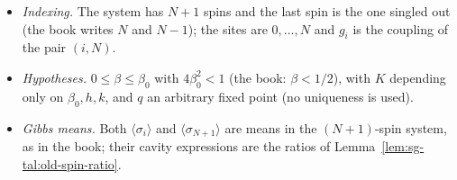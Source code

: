 \begin{remark}
\label{rem:sg-tal:dev-177}
\begin{itemize}
\item \emph{Indexing.}  The system has $N+1$ spins and the last spin is the one singled out (the book writes $N$ and $N-1$); the sites are $0,\dots,N$ and $g_i$ is the coupling of the pair $(i,N)$.
\item \emph{Hypotheses.}  $0\le\beta\le\beta_0$ with $4\beta_0^2<1$ (the book: $\beta<1/2$), with $K$ depending only on $\beta_0,h,k$, and $q$ an arbitrary fixed point (no uniqueness is used).
\item \emph{Gibbs means.}  Both $\langle\sigma_i\rangle$ and $\langle\sigma_{N+1}\rangle$ are means in the $(N+1)$-spin system, as in the book; their cavity expressions are the ratios of Lemma~\ref{lem:sg-tal:old-spin-ratio}.
\end{itemize}
\end{remark}

